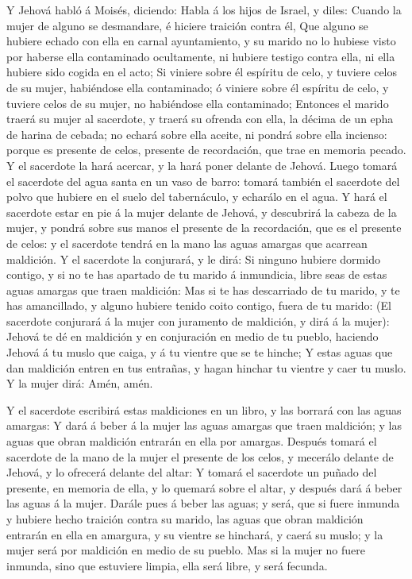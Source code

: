  Y Jehová habló á Moisés, diciendo:  Habla á
los hijos de Israel, y diles: Cuando la mujer de alguno se desmandare, é
hiciere traición contra él,  Que alguno se hubiere echado
con ella en carnal ayuntamiento, y su marido no lo hubiese visto por
haberse ella contaminado ocultamente, ni hubiere testigo contra ella, ni
ella hubiere sido cogida en el acto;  Si viniere sobre él
espíritu de celo, y tuviere celos de su mujer, habiéndose ella
contaminado; ó viniere sobre él espíritu de celo, y tuviere celos de su
mujer, no habiéndose ella contaminado;  Entonces el marido
traerá su mujer al sacerdote, y traerá su ofrenda con ella, la décima de
un epha de harina de cebada; no echará sobre ella aceite, ni pondrá
sobre ella incienso: porque es presente de celos, presente de
recordación, que trae en memoria pecado.  Y el sacerdote la
hará acercar, y la hará poner delante de Jehová.  Luego
tomará el sacerdote del agua santa en un vaso de barro: tomará también
el sacerdote del polvo que hubiere en el suelo del tabernáculo, y
echarálo en el agua.  Y hará el sacerdote estar en pie á la
mujer delante de Jehová, y descubrirá la cabeza de la mujer, y pondrá
sobre sus manos el presente de la recordación, que es el presente de
celos: y el sacerdote tendrá en la mano las aguas amargas que acarrean
maldición.  Y el sacerdote la conjurará, y le dirá: Si
ninguno hubiere dormido contigo, y si no te has apartado de tu marido á
inmundicia, libre seas de estas aguas amargas que traen maldición:
 Mas si te has descarriado de tu marido, y te has
amancillado, y alguno hubiere tenido coito contigo, fuera de tu marido:
 (El sacerdote conjurará á la mujer con juramento de
maldición, y dirá á la mujer): Jehová te dé en maldición y en
conjuración en medio de tu pueblo, haciendo Jehová á tu muslo que caiga,
y á tu vientre que se te hinche;  Y estas aguas que dan
maldición entren en tus entrañas, y hagan hinchar tu vientre y caer tu
muslo. Y la mujer dirá: Amén, amén.

 Y el sacerdote escribirá estas maldiciones en un libro, y
las borrará con las aguas amargas:  Y dará á beber á la
mujer las aguas amargas que traen maldición; y las aguas que obran
maldición entrarán en ella por amargas.  Después tomará el
sacerdote de la mano de la mujer el presente de los celos, y mecerálo
delante de Jehová, y lo ofrecerá delante del altar:  Y
tomará el sacerdote un puñado del presente, en memoria de ella, y lo
quemará sobre el altar, y después dará á beber las aguas á la mujer.
 Darále pues á beber las aguas; y será, que si fuere
inmunda y hubiere hecho traición contra su marido, las aguas que obran
maldición entrarán en ella en amargura, y su vientre se hinchará, y
caerá su muslo; y la mujer será por maldición en medio de su pueblo.
 Mas si la mujer no fuere inmunda, sino que estuviere
limpia, ella será libre, y será fecunda.

